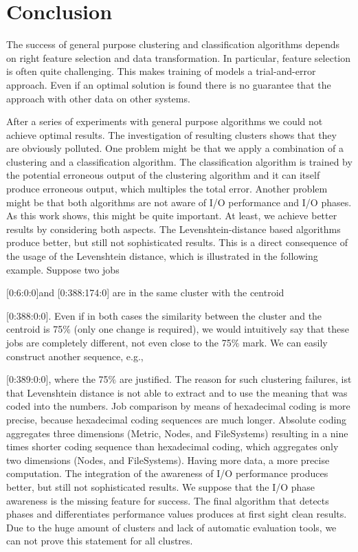 \documentclass{jhps}
\begin{document}
{{{{\section{Conclusion}

The success of general purpose clustering and classification algorithms depends on right feature selection and data transformation.
In particular, feature selection is often quite challenging.
This makes training of models a trial-and-error approach.
Even if an optimal solution is found there is no guarantee that the approach with other data on other systems.


After a series of experiments with general purpose algorithms we could not achieve optimal results.
The investigation of resulting clusters shows that they are obviously polluted.
One problem might be that we apply a combination of a clustering and a classification algorithm.
The classification algorithm is trained by the potential erroneous output of the clustering algorithm and it can itself produce erroneous output, which multiples the total error.
Another problem might be that both algorithms are not aware of I/O performance and I/O phases.
As this work shows, this might be quite important.
At least, we achieve better results by considering both aspects.
The Levenshtein-distance based algorithms produce better, but still not sophisticated results.
This is a direct consequence of the usage of the Levenshtein distance, which is illustrated in the following example.
Suppose two jobs {[0:6:0:0]and [0:388:174:0] are in the same cluster with the centroid {[0:388:0:0].
Even if in both cases the similarity between the cluster and the centroid is 75$\%$  (only one change is required), we would intuitively say that these jobs are completely different, not even close to the 75$\%$  mark.
We can easily construct another sequence, e.g., {[0:389:0:0], where the 75$\%$  are justified.
The reason for such clustering failures, ist that Levenshtein distance is not able to extract and to use the meaning that was coded into the numbers.
Job comparison by means of hexadecimal coding is more precise, because hexadecimal coding sequences are much longer.
Absolute coding aggregates three dimensions (Metric, Nodes, and FileSystems) resulting in a nine times shorter coding sequence than hexadecimal coding, which aggregates only two dimensions (Nodes, and FileSystems).
Having more data, a more precise computation.
The integration of the awareness of I/O performance produces better, but still not sophisticated results.
We suppose that the I/O phase awareness is the missing feature for success.
The final algorithm that detects phases and differentiates performance values produces at first sight clean results.
Due to the huge amount of clusters and lack of automatic evaluation tools, we can not prove this statement for all clustres.

}}}}}}}
\end{document}
